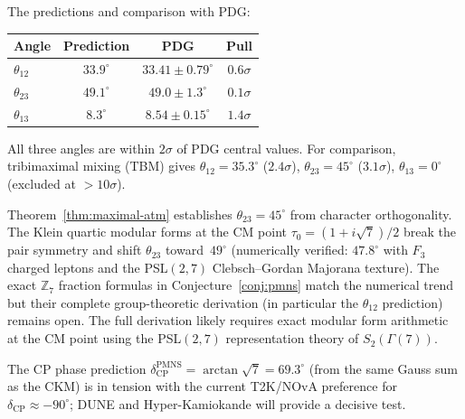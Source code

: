 \noindent
The predictions and comparison with PDG:
\begin{center}\small
\begin{tabular}{lccc}
\toprule
Angle & Prediction & PDG & Pull \\
\midrule
$\theta_{12}$ & $33.9^\circ$ & $33.41 \pm 0.79^\circ$ & $0.6\sigma$ \\
$\theta_{23}$ & $49.1^\circ$ & $49.0 \pm 1.3^\circ$ & $0.1\sigma$ \\
$\theta_{13}$ & $8.3^\circ$ & $8.54 \pm 0.15^\circ$ & $1.4\sigma$ \\
\bottomrule
\end{tabular}
\end{center}
\noindent
All three angles are within $2\sigma$ of PDG central values.
For comparison, tribimaximal mixing (TBM) gives
$\theta_{12} = 35.3^\circ$ ($2.4\sigma$),
$\theta_{23} = 45^\circ$ ($3.1\sigma$),
$\theta_{13} = 0^\circ$ (excluded at $>10\sigma$).

\begin{remark}
Theorem~\ref{thm:maximal-atm} establishes $\theta_{23} = 45^\circ$
from character orthogonality.
The Klein quartic modular forms at the CM point
$\tau_0 = (1{+}i\sqrt{7})/2$ break the pair symmetry
and shift $\theta_{23}$ toward~$49^\circ$
(numerically verified: $47.8^\circ$ with $F_3$ charged leptons
and the PSL$(2,7)$ Clebsch--Gordan Majorana texture).
The exact $\mathbb{Z}_7$ fraction formulas in
Conjecture~\ref{conj:pmns} match the numerical trend
but their complete group-theoretic derivation
(in particular the $\theta_{12}$ prediction) remains open.
The full derivation likely requires exact modular form arithmetic
at the CM point using the PSL$(2,7)$ representation theory
of $S_2(\Gamma(7))$.
\end{remark}

The CP phase prediction $\delta_{\mathrm{CP}}^{\mathrm{PMNS}}
= \arctan\sqrt{7} = 69.3^\circ$
(from the same Gauss sum as the CKM)
is in tension with the current T2K/NOvA preference for
$\delta_{\mathrm{CP}} \approx -90^\circ$;
DUNE and Hyper-Kamiokande will provide a decisive test.



